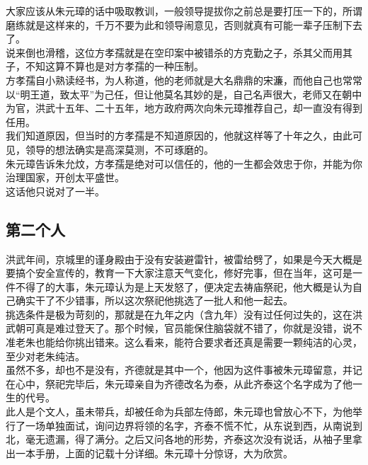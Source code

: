 \begin{multicols}{\theparacolNo}
大家应该从朱元璋的话中吸取教训，一般领导提拔你之前总是要打压一下的，所谓磨练就是这样来的，千万不要为此和领导闹意见，否则就真有可能一辈子压制下去了。\\

说来倒也滑稽，这位方孝孺就是在空印案中被错杀的方克勤之子，杀其父而用其子，不知这算不算也是对方孝孺的一种压制。\\

方孝孺自小熟读经书，为人称道，他的老师就是大名鼎鼎的宋濂，而他自己也常常以“明王道，致太平”为己任，但让他莫名其妙的是，自己名声很大，老师又在朝中为官，洪武十五年、二十五年，地方政府两次向朱元璋推荐自己，却一直没有得到任用。\\

我们知道原因，但当时的方孝孺是不知道原因的，他就这样等了十年之久，由此可见，领导的想法确实是高深莫测，不可琢磨的。\\

朱元璋告诉朱允炆，方孝孺是绝对可以信任的，他的一生都会效忠于你，并能为你治理国家，开创太平盛世。\\

这话他只说对了一半。\\

\subsection{第二个人}
洪武年间，京城里的谨身殿由于没有安装避雷针，被雷给劈了，如果是今天大概是要搞个安全宣传的，教育一下大家注意天气变化，修好完事，但在当年，这可是一件不得了的大事，朱元璋认为是上天发怒了，便决定去祷庙祭祀，他大概是认为自己确实干了不少错事，所以这次祭祀他挑选了一批人和他一起去。\\

挑选条件是极为苛刻的，那就是在九年之内（含九年）没有过任何过失的，这在洪武朝可真是难过登天了。那个时候，官员能保住脑袋就不错了，你就是没错，说不准老朱也能给你挑出错来。这么看来，能符合要求者还真是需要一颗纯洁的心灵，至少对老朱纯洁。\\

虽然不多，却也不是没有，齐德就是其中一个，他因为这件事被朱元璋留意，并记在心中，祭祀完毕后，朱元璋亲自为齐德改名为泰，从此齐泰这个名字成为了他一生的代号。\\

此人是个文人，虽未带兵，却被任命为兵部左侍郎，朱元璋也曾放心不下，为他举行了一场单独面试，询问边界将领的名字，齐泰不慌不忙，从东说到西，从南说到北，毫无遗漏，得了满分。之后又问各地的形势，齐泰这次没有说话，从袖子里拿出一本手册，上面的记载十分详细。朱元璋十分惊讶，大为欣赏。\\


\end{multicols}
